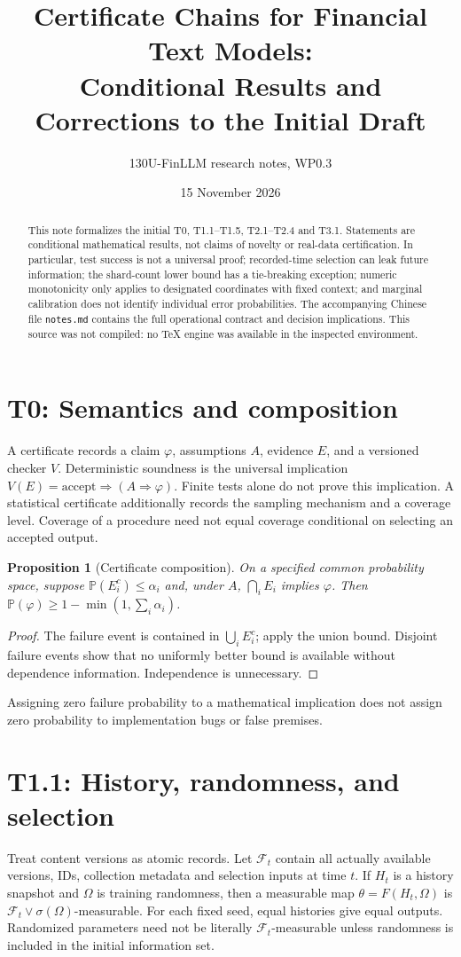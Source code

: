 \documentclass[11pt]{article}
\title{Certificate Chains for Financial Text Models:\\Conditional Results and Corrections to the Initial Draft}
\author{130U-FinLLM research notes, WP0.3}
\date{15 November 2026}
\newtheorem{proposition}{Proposition}
\newcommand{\Prob}{\mathbb P}
\begin{document}
\maketitle
\begin{abstract}
This note formalizes the initial T0, T1.1--T1.5,
T2.1--T2.4 and T3.1. Statements are conditional mathematical results,
not claims of novelty or real-data certification. In particular, test
success is not a universal proof; recorded-time selection can leak future
information; the shard-count lower bound has a tie-breaking exception;
numeric monotonicity only applies to designated coordinates with fixed
context; and marginal calibration does not identify individual error
probabilities. The accompanying Chinese file \texttt{notes.md} contains
the full operational contract and decision implications. This source was
not compiled: no TeX engine was available in the inspected environment.
\end{abstract}

\section{T0: Semantics and composition}
A certificate records a claim $\varphi$, assumptions $A$, evidence $E$,
and a versioned checker $V$. Deterministic soundness is the universal
implication $V(E)=\mathrm{accept}\Rightarrow(A\Rightarrow\varphi)$.
Finite tests alone do not prove this implication. A statistical
certificate additionally records the sampling mechanism and a coverage
level. Coverage of a procedure need not equal coverage conditional on
selecting an accepted output.
\begin{proposition}[Certificate composition]
On a specified common probability space, suppose
$\Prob(E_i^c)\le\alpha_i$ and, under $A$, $\bigcap_i E_i$ implies
$\varphi$. Then $\Prob(\varphi)\ge1-\min(1,\sum_i\alpha_i)$.
\end{proposition}
\begin{proof}
The failure event is contained in $\bigcup_i E_i^c$; apply the union
bound. Disjoint failure events show that no uniformly better bound is
available without dependence information. Independence is unnecessary.
\end{proof}
Assigning zero failure probability to a mathematical implication does
not assign zero probability to implementation bugs or false premises.

\section{T1.1: History, randomness, and selection}
Treat content versions as atomic records. Let $\mathcal F_t$ contain
all actually available versions, IDs, collection metadata and selection
inputs at time $t$. If $H_t$ is a history snapshot and $\Omega$ is
training randomness, then a measurable map
$\theta=F(H_t,\Omega)$ is
$\mathcal F_t\vee\sigma(\Omega)$-measurable. For each fixed seed,
equal histories give equal outputs. Randomized parameters need not be
literally $\mathcal F_t$-measurable unless randomness is included in the
initial information set.
\end{document}
